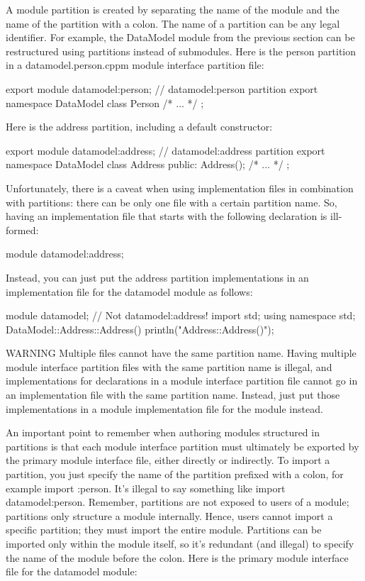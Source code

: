 A module partition is created by separating the name of the module and the name of the partition with a colon. The name of a partition can be any legal identifier. For example, the DataModel module from the previous section can be restructured using partitions instead of submodules. Here is the person partition in a datamodel.person.cppm module interface partition file:

\begin{cpp}
export module datamodel:person; // datamodel:person partition
export namespace DataModel { class Person { /* ... */ }; }
\end{cpp}

Here is the address partition, including a default constructor:

\begin{cpp}
export module datamodel:address; // datamodel:address partition
export namespace DataModel
{
    class Address
    {
        public:
        Address();
        /* ... */
    };
}
\end{cpp}

Unfortunately, there is a caveat when using implementation files in combination with partitions: there can be only one file with a certain partition name. So, having an implementation file that starts with the following declaration is ill-formed:

\begin{cpp}
module datamodel:address;
\end{cpp}

Instead, you can just put the address partition implementations in an implementation file for the datamodel module as follows:

\begin{cpp}
module datamodel; // Not datamodel:address!
import std;
using namespace std;
DataModel::Address::Address() { println("Address::Address()"); }
\end{cpp}

\begin{myWarning}{WARNING}
Multiple files cannot have the same partition name. Having multiple module interface partition files with the same partition name is illegal, and implementations for declarations in a module interface partition file cannot go in an implementation file with the same partition name. Instead, just put those implementations in a module implementation file for the module instead.
\end{myWarning}

An important point to remember when authoring modules structured in partitions is that each module interface partition must ultimately be exported by the primary module interface file, either directly or indirectly. To import a partition, you just specify the name of the partition prefixed with a colon, for example import :person. It’s illegal to say something like import datamodel:person. Remember, partitions are not exposed to users of a module; partitions only structure a module internally. Hence, users cannot import a specific partition; they must import the entire module. Partitions can be imported only within the module itself, so it’s redundant (and illegal) to specify the name of the module before the colon. Here is the primary module interface file for the datamodel module:

